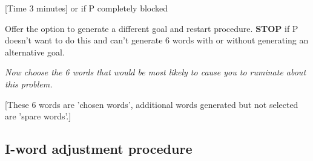 [\textcolor[rgb]{0.0,0.5019608,0.0}{Time 3 minutes}] or if P completely blocked

Offer the option to generate a different goal and restart
procedure. \textbf{STOP} if P doesn't want to do this and can't generate
6 words with or without generating an alternative goal.

\textit{Now choose the 6 words that would be most likely to cause you to ruminate about this problem.}

[These 6 words are 'chosen words', additional words generated but not selected are 'spare words'.]

\subsection{I-word adjustment procedure}

